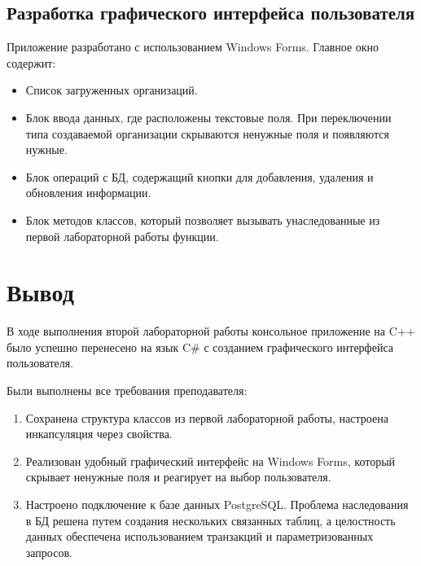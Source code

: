 \documentclass[oneside,a4paper,14pt]{extarticle}
\begin{document}
\newpage

\subsection*{Разработка графического интерфейса пользователя}

Приложение разработано с использованием Windows Forms. Главное окно содержит:
\begin{itemize}
    \item Список загруженных организаций.
    \item Блок ввода данных, где расположены текстовые поля. При переключении типа создаваемой организации скрываются ненужные поля и появляются нужные.
    \item Блок операций с БД, содержащий кнопки для добавления, удаления и обновления информации.
    \item Блок методов классов, который позволяет вызывать унаследованные из первой лабораторной работы функции.
\end{itemize}

\section*{Вывод}

В ходе выполнения второй лабораторной работы консольное приложение на C++ было успешно перенесено на язык C\# с созданием графического интерфейса пользователя.

Были выполнены все требования преподавателя:
\begin{enumerate}
    \item Сохранена структура классов из первой лабораторной работы, настроена инкапсуляция через свойства.
    \item Реализован удобный графический интерфейс на Windows Forms, который скрывает ненужные поля и реагирует на выбор пользователя.
    \item Настроено подключение к базе данных PostgreSQL. Проблема наследования в БД решена путем создания нескольких связанных таблиц, а целостность данных обеспечена использованием транзакций и параметризованных запросов.
\end{enumerate}
\end{document}
